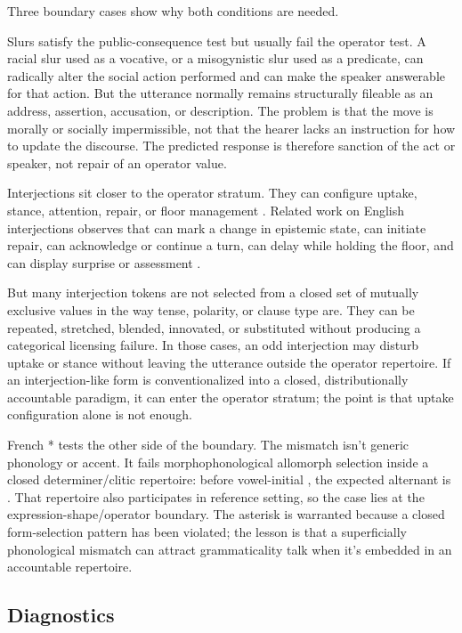 \documentclass[12pt,letterpaper]{article}
\begin{document}
Three boundary cases show why both conditions are needed.

Slurs satisfy the public-consequence test but usually fail the operator test. A racial slur used as a vocative, or a misogynistic slur used as a predicate, can radically alter the social action performed and can make the speaker answerable for that action. But the utterance normally remains structurally fileable as an address, assertion, accusation, or description. The problem is that the move is morally or socially impermissible, not that the hearer lacks an instruction for how to update the discourse. The predicted response is therefore sanction of the act or speaker, not repair of an operator value.

Interjections sit closer to the operator stratum. They can configure uptake, stance, attention, repair, or floor management \citep{ameka1992}. Related work on English interjections observes that  can mark a change in epistemic state,  can initiate repair,  can acknowledge or continue a turn,  can delay while holding the floor, and  can display surprise or assessment \citep{author2026interjections}.

But many interjection tokens are not selected from a closed set of mutually exclusive values in the way tense, polarity, or clause type are. They can be repeated, stretched, blended, innovated, or substituted without producing a categorical licensing failure. In those cases, an odd interjection may disturb uptake or stance without leaving the utterance outside the operator repertoire. If an interjection-like form is conventionalized into a closed, distributionally accountable paradigm, it can enter the operator stratum; the point is that uptake configuration alone is not enough.

French * tests the other side of the boundary. The mismatch isn't generic phonology or accent. It fails morphophonological allomorph selection inside a closed determiner/clitic repertoire: before vowel-initial , the expected alternant is . That repertoire also participates in reference setting, so the case lies at the expression-shape/operator boundary. The asterisk is warranted because a closed form-selection pattern has been violated; the lesson is that a superficially phonological mismatch can attract grammaticality talk when it's embedded in an accountable repertoire.

\subsection{Diagnostics}
\end{document}
